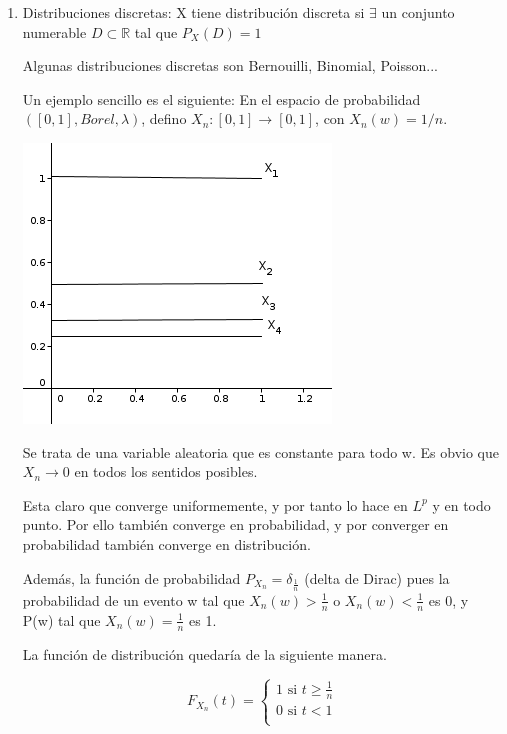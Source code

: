 \documentclass{apuntes}
\begin{document}
\begin{enumerate}
\item Distribuciones discretas: X tiene distribución discreta si $\exists$ un conjunto numerable $D\subset \mathbb{R}$ tal que $P_X(D)=1$

Algunas distribuciones discretas son Bernouilli, Binomial, Poisson...


\begin{example}
Un ejemplo sencillo es el siguiente: En el espacio de probabilidad $([0,1], Borel, \lambda)$, defino $X_n:[0,1]\rightarrow[0,1]$, con $X_n(w)=1/n$.

\begin{center}
\includegraphics[scale=0.4]{img/g1.png}
\end{center}

Se trata de una variable aleatoria que es constante para todo w. Es obvio que $X_n \rightarrow 0$ en todos los sentidos posibles.

Esta claro que converge uniformemente, y por tanto lo hace en $L^p$ y en todo punto. Por ello también converge en probabilidad, y por converger en probabilidad también converge en distribución.

Además, la función de probabilidad $P_{X_n}=\delta_{\frac{1}{n}}$ (delta de Dirac) pues la probabilidad de un evento w tal que $X_n(w)>\frac{1}{n}$ o $X_n(w)<\frac{1}{n}$ es 0, y P(w) tal que $X_n(w)=\frac{1}{n}$ es 1.

La función de distribución quedaría de la siguiente manera.

$$
F_{X_n}(t) =
  \left\lbrace
  \begin{array}{l}
     1 \text{ si } t \geq \frac{1}{n}\\
     0 \text{ si } t < 1 \\
  \end{array}
  \right.
$$


\end{example}
\end{enumerate}
\end{document}
